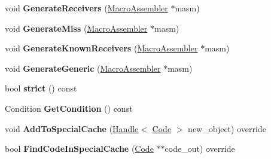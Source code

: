 \begin{DoxyCompactItemize}
\item 
void {\bfseries Generate\+Receivers} (\hyperlink{classv8_1_1internal_1_1_macro_assembler}{Macro\+Assembler} $\ast$masm)\hypertarget{classv8_1_1internal_1_1_compare_i_c_stub_a8b11e101c78790b8e415c7fa503befc8}{}\label{classv8_1_1internal_1_1_compare_i_c_stub_a8b11e101c78790b8e415c7fa503befc8}

\item 
void {\bfseries Generate\+Miss} (\hyperlink{classv8_1_1internal_1_1_macro_assembler}{Macro\+Assembler} $\ast$masm)\hypertarget{classv8_1_1internal_1_1_compare_i_c_stub_a74b22f754235c74655d43b9ebc1e7a3b}{}\label{classv8_1_1internal_1_1_compare_i_c_stub_a74b22f754235c74655d43b9ebc1e7a3b}

\item 
void {\bfseries Generate\+Known\+Receivers} (\hyperlink{classv8_1_1internal_1_1_macro_assembler}{Macro\+Assembler} $\ast$masm)\hypertarget{classv8_1_1internal_1_1_compare_i_c_stub_a9976f614d92285b4e31bb3baef79b349}{}\label{classv8_1_1internal_1_1_compare_i_c_stub_a9976f614d92285b4e31bb3baef79b349}

\item 
void {\bfseries Generate\+Generic} (\hyperlink{classv8_1_1internal_1_1_macro_assembler}{Macro\+Assembler} $\ast$masm)\hypertarget{classv8_1_1internal_1_1_compare_i_c_stub_a8ca8933b6e7dd9db589fb61cd1e44b62}{}\label{classv8_1_1internal_1_1_compare_i_c_stub_a8ca8933b6e7dd9db589fb61cd1e44b62}

\item 
bool {\bfseries strict} () const \hypertarget{classv8_1_1internal_1_1_compare_i_c_stub_a3d2dbc9d3f403fdfaffc85467f303ef8}{}\label{classv8_1_1internal_1_1_compare_i_c_stub_a3d2dbc9d3f403fdfaffc85467f303ef8}

\item 
Condition {\bfseries Get\+Condition} () const \hypertarget{classv8_1_1internal_1_1_compare_i_c_stub_a5db4ef0f3e3c4c4246d6c6195973dc6e}{}\label{classv8_1_1internal_1_1_compare_i_c_stub_a5db4ef0f3e3c4c4246d6c6195973dc6e}

\item 
void {\bfseries Add\+To\+Special\+Cache} (\hyperlink{classv8_1_1internal_1_1_handle}{Handle}$<$ \hyperlink{classv8_1_1internal_1_1_code}{Code} $>$ new\+\_\+object) override\hypertarget{classv8_1_1internal_1_1_compare_i_c_stub_a217ccb739d48bfc7730990427bc34a6c}{}\label{classv8_1_1internal_1_1_compare_i_c_stub_a217ccb739d48bfc7730990427bc34a6c}

\item 
bool {\bfseries Find\+Code\+In\+Special\+Cache} (\hyperlink{classv8_1_1internal_1_1_code}{Code} $\ast$$\ast$code\+\_\+out) override\hypertarget{classv8_1_1internal_1_1_compare_i_c_stub_a2e0bc50bbe21729a4feef883b063726e}{}\label{classv8_1_1internal_1_1_compare_i_c_stub_a2e0bc50bbe21729a4feef883b063726e}


\end{DoxyCompactItemize}

